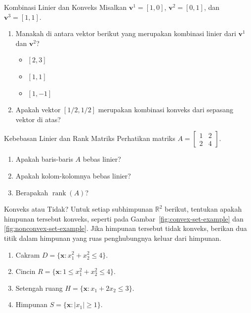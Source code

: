 \begin{ex}{Kombinasi Linier dan Konveks}{}
Misalkan \( \mathbf{v}^1 = [1, 0] \), \( \mathbf{v}^2 = [0, 1] \), dan \( \mathbf{v}^3 = [1, 1] \).

\begin{enumerate}
    \item Manakah di antara vektor berikut yang merupakan kombinasi linier dari \( \mathbf{v}^1 \) dan \( \mathbf{v}^2 \)?  
    \begin{itemize}
        \item[(a)] \( [2, 3] \)  
        \item[(b)] \( [1, 1] \)  
        \item[(c)] \( [1, -1] \)
    \end{itemize}
    \item Apakah vektor \( [1/2, 1/2] \) merupakan kombinasi konveks dari sepasang vektor di atas?
\end{enumerate}
\exrefs{\S\ref{sec:math-preliminaries}, \S\ref{sec:convexity}}
\end{ex}

\begin{ex}{Kebebasan Linier dan Rank Matriks}{}
Perhatikan matriks \( A = \begin{bmatrix} 1 & 2 \\ 2 & 4 \end{bmatrix} \).
\begin{enumerate}
    \item Apakah baris-baris \( A \) bebas linier?
    \item Apakah kolom-kolomnya bebas linier?
    \item Berapakah \( \operatorname{rank}(A) \)?
\end{enumerate}
\exrefs{\S\ref{sec:math-preliminaries}}
\end{ex}

\begin{ex}{Konveks atau Tidak?}{}
\label{ex:convex-or-not}
Untuk setiap subhimpunan \( \mathbb{R}^2 \) berikut, tentukan apakah himpunan tersebut konveks, seperti pada Gambar~\ref{fig:convex-set-example} dan \ref{fig:nonconvex-set-example}. Jika himpunan tersebut tidak konveks, berikan dua titik dalam himpunan yang ruas penghubungnya keluar dari himpunan.
\begin{enumerate}
    \item Cakram \( D = \{ \mathbf{x} : x_1^2 + x_2^2 \leq 4 \} \).
    \item Cincin \( R = \{ \mathbf{x} : 1 \leq x_1^2 + x_2^2 \leq 4 \} \).
    \item Setengah ruang \( H = \{ \mathbf{x} : x_1 + 2x_2 \leq 3 \} \).
    \item Himpunan \( S = \{ \mathbf{x} : |x_1| \geq 1 \} \).
\end{enumerate}
\exrefs{\S\ref{sec:convexity}}
\end{ex}

